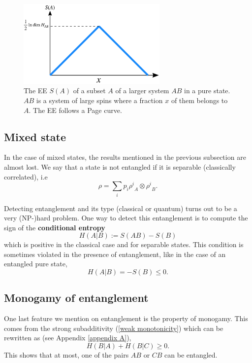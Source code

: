 \begin{figure}
    \centering
    \includegraphics[width=0.65\textwidth]{figures/page_curve.png}
    \caption{The EE $S(A)$ of a subset $A$ of a larger system $AB$ in a pure state. $AB$ is a system of large spins where a fraction $x$ of them belongs to $A$. The EE follows a Page curve.}
    \label{page curve}
\end{figure}

\subsection{Mixed state}
In the case of mixed states, the results mentioned in the previous subsection are almost lost. We say that a state is not entangled if it is separable (classically correlated), i.e
\begin{equation}
    \rho = \sum_ip_i{\rho^i}_A\otimes{\rho^i}_B.
\end{equation}

Detecting entanglement and its type (classical or quantum) turns out to be a very (NP-)hard problem\cite{gharibian2009strong}. One way to detect this entanglement is to compute the sign of the \textbf{conditional entropy}
\begin{equation}\label{conditional entropy}
    H\left(A|B\right):=S\left(AB\right)-S\left(B\right)
\end{equation}
which is positive in the classical case and for separable states. This condition is sometimes violated in the presence of entanglement, like in the case of an entangled pure state,
\begin{equation}\label{negative H(A|B)}
    H\left(A|B\right) = -S\left(B\right)\leq 0.
\end{equation}

\subsection{Monogamy of entanglement}

One last feature we mention on entanglement is the property of monogamy. This comes from the strong subadditivity (\ref{weak monotonicity}) which can be rewritten as (see Appendix \ref{appendix A}),
\begin{equation}\label{SSA}
     H\left(B|A\right) + H\left(B|C\right)\geq 0.
\end{equation}
This shows that at most, one of the pairs $AB$ or $CB$ can be entangled.

